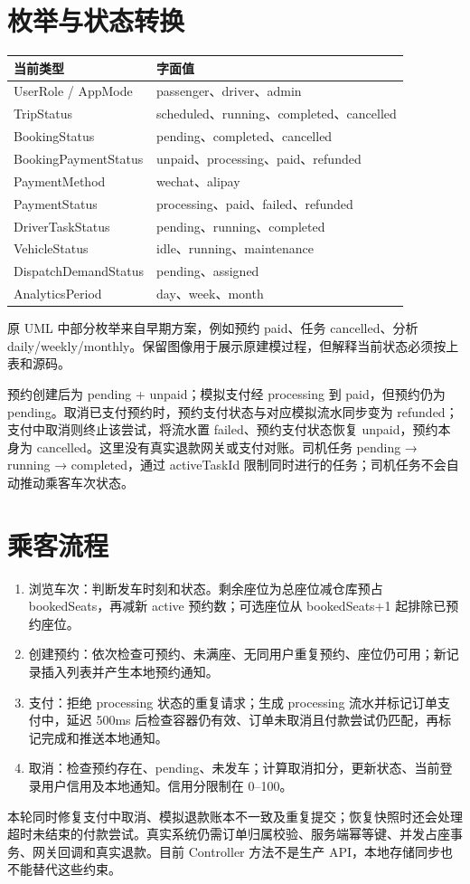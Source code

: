 \documentclass[UTF8,fontset=fandol,zihao=-4,oneside]{ctexrep}
\begin{document}
\section{枚举与状态转换}
\begin{longtable}{p{4.5cm}p{10.2cm}}
\toprule 当前类型 & 字面值 \\ \midrule
UserRole / AppMode & passenger、driver、admin \\
TripStatus & scheduled、running、completed、cancelled \\
BookingStatus & pending、completed、cancelled \\
BookingPaymentStatus & unpaid、processing、paid、refunded \\
PaymentMethod & wechat、alipay \\
PaymentStatus & processing、paid、failed、refunded \\
DriverTaskStatus & pending、running、completed \\
VehicleStatus & idle、running、maintenance \\
DispatchDemandStatus & pending、assigned \\
AnalyticsPeriod & day、week、month \\
\bottomrule
\end{longtable}
原 UML 中部分枚举来自早期方案，例如预约 paid、任务 cancelled、分析 daily/weekly/monthly。保留图像用于展示原建模过程，但解释当前状态必须按上表和源码。

预约创建后为 pending + unpaid；模拟支付经 processing 到 paid，但预约仍为 pending。取消已支付预约时，预约支付状态与对应模拟流水同步变为 refunded；支付中取消则终止该尝试，将流水置 failed、预约支付状态恢复 unpaid，预约本身为 cancelled。这里没有真实退款网关或支付对账。司机任务 pending → running → completed，通过 activeTaskId 限制同时进行的任务；司机任务不会自动推动乘客车次状态。

\section{乘客流程}
\begin{enumerate}
\item 浏览车次：判断发车时刻和状态。剩余座位为总座位减仓库预占 bookedSeats，再减新 active 预约数；可选座位从 bookedSeats+1 起排除已预约座位。
\item 创建预约：依次检查可预约、未满座、无同用户重复预约、座位仍可用；新记录插入列表并产生本地预约通知。
\item 支付：拒绝 processing 状态的重复请求；生成 processing 流水并标记订单支付中，延迟 500ms 后检查容器仍有效、订单未取消且付款尝试仍匹配，再标记完成和推送本地通知。
\item 取消：检查预约存在、pending、未发车；计算取消扣分，更新状态、当前登录用户信用及本地通知。信用分限制在 0--100。
\end{enumerate}
本轮同时修复支付中取消、模拟退款账本不一致及重复提交；恢复快照时还会处理超时未结束的付款尝试。真实系统仍需订单归属校验、服务端幂等键、并发占座事务、网关回调和真实退款。目前 Controller 方法不是生产 API，本地存储同步也不能替代这些约束。
\end{document}

